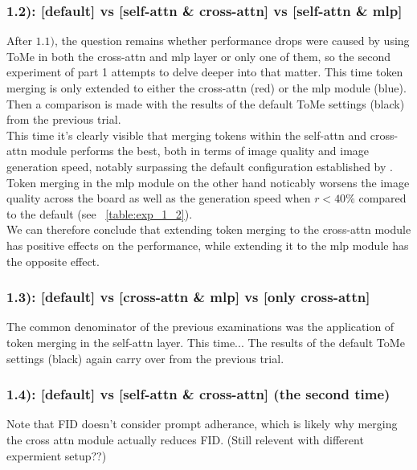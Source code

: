 \subsubsection*{1.2): [default] vs [self-attn \& cross-attn] vs [self-attn \& mlp]}
\begin{figure}[!htb]
    
    
\end{figure}
After \(1.1)\), the question remains whether performance drops were caused by using ToMe in both the cross-attn and mlp layer or only one of them, so the second experiment of part 1 attempts to delve deeper into that matter. This time token merging is only extended to either the cross-attn (red) or the mlp module (blue). Then a comparison is made with the results of the default ToMe settings (black) from the previous trial.\\
This time it's clearly visible that merging tokens within the self-attn and cross-attn module performs the best, both in terms of image quality and image generation speed, notably surpassing the default configuration established by \cite{bolya2023tomesd}.\\
Token merging in the mlp module on the other hand noticably worsens the image quality across the board as well as the generation speed when $r<40\%$ compared to the default (see ~\ref{table:exp_1_2}).\\
We can therefore conclude that extending token merging to the cross-attn module has positive effects on the performance, while extending it to the mlp module has the opposite effect.

\newpage
\subsubsection*{1.3): [default] vs [cross-attn \& mlp] vs [only cross-attn]}
\begin{figure}[!htb]
    
    
\end{figure}
The common denominator of the previous examinations was the application of token merging in the self-attn layer. This time...
The results of the default ToMe settings (black) again carry over from the previous trial.

\newpage
\subsubsection*{1.4): [default] vs [self-attn \& cross-attn] (the second time)}
Note that FID doesn’t consider prompt adherance, which is likely why merging the cross attn module actually reduces FID. (Still relevent with different expermient setup??)
\begin{figure}[!htb]
    
    
\end{figure}

